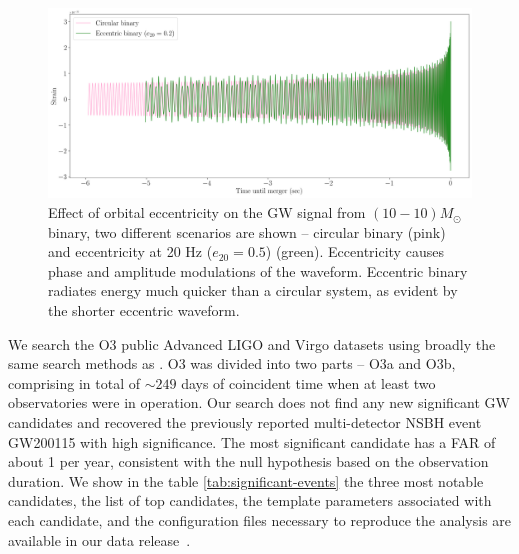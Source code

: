 \begin{figure}
    \centering
    \includegraphics[width=\textwidth]{figures/ecc_search/eccentric-wf.png}
    \caption{Effect of orbital eccentricity on the GW signal from $(10-10)M_{\odot}$ binary, two different scenarios are shown -- circular binary (pink) and eccentricity at 20 Hz ($e_{20} = 0.5$) (green). Eccentricity causes phase and amplitude modulations of the waveform. Eccentric binary radiates energy much quicker than a circular system, as evident by the shorter eccentric waveform.}
    \label{fig:ecc-WF}
\end{figure}


We search the O3 public Advanced LIGO and Virgo datasets using broadly the same search methods as \cite{Nitz:2021zwj}. O3 was divided into two parts -- O3a and O3b, comprising in total of $\sim 249$ days of coincident time when at least two observatories were in operation. Our search does not find any new significant GW candidates and recovered the previously reported multi-detector NSBH event GW200115 with high significance. The most significant candidate has a FAR of about 1 per year, consistent with the null hypothesis based on the observation duration. We show in the table \ref{tab:significant-events} the three most notable candidates, the list of top candidates, the template parameters associated with each candidate, and the configuration files necessary to reproduce the analysis are available in our data release~\cite{github}.  

